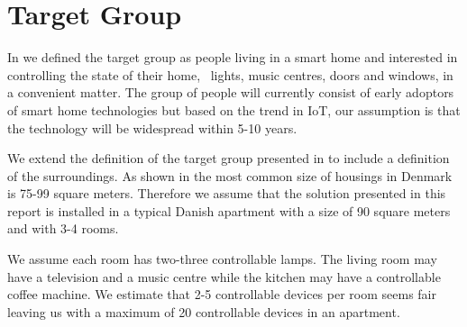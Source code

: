 \section{Target Group}
\label{sec:target-group}

In \cite[p. 15]{prespecialisation} we defined the target group as people living in a smart home and interested in controlling the state of their home, \eg~lights, music centres, doors and windows, in a convenient matter. The group of people will currently consist of early adoptors of smart home technologies but based on the trend in IoT, our assumption is that the technology will be widespread within 5-10 years. 

We extend the definition of the target group presented in \cite[p. 15]{prespecialisation} to include a definition of the surroundings. As shown in  the most common size of housings in Denmark is 75-99 square meters. Therefore we assume that the solution presented in this report is installed in a typical Danish apartment with a size of 90 square meters and with 3-4 rooms.

We assume each room has two-three controllable lamps. The living room may have a television and a music centre while the kitchen may have a controllable coffee machine. We estimate that 2-5 controllable devices per room seems fair leaving us with a maximum of 20 controllable devices in an apartment.

